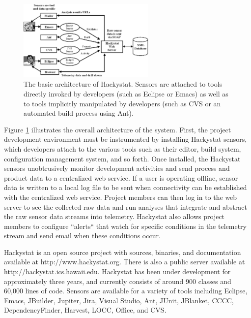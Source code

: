 \documentclass[times,10pt,twocolumn]{article}
\begin{document}
\begin{figure}[htpb]
  \centering
  \includegraphics[width=0.60\textwidth]{architecture.eps}
  \caption{The basic architecture of Hackystat. Sensors are attached to
  tools directly invoked by developers (such as Eclipse or Emacs) as
  well as to tools implicitly manipulated by developers (such as CVS or 
  an automated build process using Ant).}
  \label{fig:architecture}
\end{figure}

Figure \ref{fig:architecture} illustrates the overall architecture of
the system. First, the project development environment must be
instrumented by installing Hackystat sensors, which developers attach
to the various tools such as their editor, build system, configuration
management system, and so forth. Once installed, the Hackystat sensors
unobtrusively monitor development activities and send process and
product data to a centralized web service.  If a user is operating
offline, sensor data is written to a local log file to be sent
when connectivity can be established with the centralized web service.
Project members can then log in to the web server to see the collected
raw data and run analyses that integrate and abstract the raw sensor
data streams into telemetry.  Hackystat also allows project members to
configure ``alerts`` that watch for specific conditions in the
telemetry stream and send email when these conditions occur.

Hackystat is an open source project with sources, binaries, and
documentation available at http://www.hackystat.org.  There is also a
public server available at http://hackystat.ics.hawaii.edu.  Hackystat has
been under development for approximately three years, and currently
consists of around 900 classes and 60,000 lines of code.  Sensors are
available for a variety of tools including Eclipse, Emacs, JBuilder,
Jupiter, Jira, Visual Studio, Ant, JUnit, JBlanket, CCCC, DependencyFinder,
Harvest, LOCC, Office, and CVS.  

\label{sec:telemetry}
\end{document}

